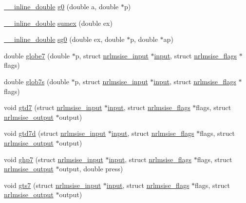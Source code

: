 \begin{DoxyCompactItemize}
\item 
\hyperlink{nrlmsise-00_8h_ad38d2e3fa313d97ec413ff90989d9fdd}{\+\_\+\+\_\+inline\+\_\+double} \hyperlink{nrlmsise-00_8c_adb43b07f5b513c1fc160ad8e49e91468}{g0} (double a, double $\ast$p)
\item 
\hyperlink{nrlmsise-00_8h_ad38d2e3fa313d97ec413ff90989d9fdd}{\+\_\+\+\_\+inline\+\_\+double} \hyperlink{nrlmsise-00_8c_ac607590e0e6c779fc4a6cbb1261975c6}{sumex} (double ex)
\item 
\hyperlink{nrlmsise-00_8h_ad38d2e3fa313d97ec413ff90989d9fdd}{\+\_\+\+\_\+inline\+\_\+double} \hyperlink{nrlmsise-00_8c_a7f68e5f9adad978d8d875e5e927802e2}{sg0} (double ex, double $\ast$p, double $\ast$ap)
\item 
double \hyperlink{nrlmsise-00_8c_ac4b2621b2a2cb25659563dbc6cd081c4}{globe7} (double $\ast$p, struct \hyperlink{structnrlmsise__input}{nrlmsise\+\_\+input} $\ast$\hyperlink{calc__flex_8c_a171692544b8e065853e387755849a433}{input}, struct \hyperlink{structnrlmsise__flags}{nrlmsise\+\_\+flags} $\ast$flags)
\item 
double \hyperlink{nrlmsise-00_8c_a6cd7c8294f6550f02fd6257e0aff7db2}{glob7s} (double $\ast$p, struct \hyperlink{structnrlmsise__input}{nrlmsise\+\_\+input} $\ast$\hyperlink{calc__flex_8c_a171692544b8e065853e387755849a433}{input}, struct \hyperlink{structnrlmsise__flags}{nrlmsise\+\_\+flags} $\ast$flags)
\item 
void \hyperlink{nrlmsise-00_8c_a0734128a68d5d8a372352d7436445d3e}{gtd7} (struct \hyperlink{structnrlmsise__input}{nrlmsise\+\_\+input} $\ast$\hyperlink{calc__flex_8c_a171692544b8e065853e387755849a433}{input}, struct \hyperlink{structnrlmsise__flags}{nrlmsise\+\_\+flags} $\ast$flags, struct \hyperlink{structnrlmsise__output}{nrlmsise\+\_\+output} $\ast$output)
\item 
void \hyperlink{nrlmsise-00_8c_a641d02c0e964627af5da468d4e07b87a}{gtd7d} (struct \hyperlink{structnrlmsise__input}{nrlmsise\+\_\+input} $\ast$\hyperlink{calc__flex_8c_a171692544b8e065853e387755849a433}{input}, struct \hyperlink{structnrlmsise__flags}{nrlmsise\+\_\+flags} $\ast$flags, struct \hyperlink{structnrlmsise__output}{nrlmsise\+\_\+output} $\ast$output)
\item 
void \hyperlink{nrlmsise-00_8c_a315893daf042707ca0e6e763ac9eabaf}{ghp7} (struct \hyperlink{structnrlmsise__input}{nrlmsise\+\_\+input} $\ast$\hyperlink{calc__flex_8c_a171692544b8e065853e387755849a433}{input}, struct \hyperlink{structnrlmsise__flags}{nrlmsise\+\_\+flags} $\ast$flags, struct \hyperlink{structnrlmsise__output}{nrlmsise\+\_\+output} $\ast$output, double press)
\item 
void \hyperlink{nrlmsise-00_8c_a3e6980995783492f90a76daf5da46e4b}{gts7} (struct \hyperlink{structnrlmsise__input}{nrlmsise\+\_\+input} $\ast$\hyperlink{calc__flex_8c_a171692544b8e065853e387755849a433}{input}, struct \hyperlink{structnrlmsise__flags}{nrlmsise\+\_\+flags} $\ast$flags, struct \hyperlink{structnrlmsise__output}{nrlmsise\+\_\+output} $\ast$output)
\end{DoxyCompactItemize}
